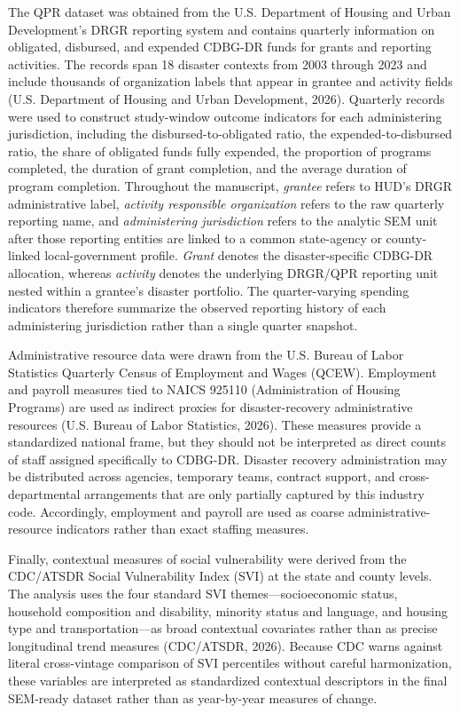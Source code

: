 \documentclass[
  number]{elsarticle}
\begin{document}
The QPR dataset was obtained from the U.S. Department of Housing and
Urban Development's DRGR reporting system and contains quarterly
information on obligated, disbursed, and expended CDBG-DR funds for
grants and reporting activities. The records span 18 disaster contexts
from 2003 through 2023 and include thousands of organization labels that
appear in grantee and activity fields (U.S. Department of Housing and
Urban Development, 2026). Quarterly records were used to construct
study-window outcome indicators for each administering jurisdiction,
including the disbursed-to-obligated ratio, the expended-to-disbursed
ratio, the share of obligated funds fully expended, the proportion of
programs completed, the duration of grant completion, and the average
duration of program completion. Throughout the manuscript,
\emph{grantee} refers to HUD's DRGR administrative label, \emph{activity
responsible organization} refers to the raw quarterly reporting name,
and \emph{administering jurisdiction} refers to the analytic SEM unit
after those reporting entities are linked to a common state-agency or
county-linked local-government profile. \emph{Grant} denotes the
disaster-specific CDBG-DR allocation, whereas \emph{activity} denotes
the underlying DRGR/QPR reporting unit nested within a grantee's
disaster portfolio. The quarter-varying spending indicators therefore
summarize the observed reporting history of each administering
jurisdiction rather than a single quarter snapshot.

Administrative resource data were drawn from the U.S. Bureau of Labor
Statistics Quarterly Census of Employment and Wages (QCEW). Employment
and payroll measures tied to NAICS 925110 (Administration of Housing
Programs) are used as indirect proxies for disaster-recovery
administrative resources (U.S. Bureau of Labor Statistics, 2026). These
measures provide a standardized national frame, but they should not be
interpreted as direct counts of staff assigned specifically to CDBG-DR.
Disaster recovery administration may be distributed across agencies,
temporary teams, contract support, and cross-departmental arrangements
that are only partially captured by this industry code. Accordingly,
employment and payroll are used as coarse administrative-resource
indicators rather than exact staffing measures.

Finally, contextual measures of social vulnerability were derived from
the CDC/ATSDR Social Vulnerability Index (SVI) at the state and county
levels. The analysis uses the four standard SVI themes---socioeconomic
status, household composition and disability, minority status and
language, and housing type and transportation---as broad contextual
covariates rather than as precise longitudinal trend measures
(CDC/ATSDR, 2026). Because CDC warns against literal cross-vintage
comparison of SVI percentiles without careful harmonization, these
variables are interpreted as standardized contextual descriptors in the
final SEM-ready dataset rather than as year-by-year measures of change.
\end{document}
